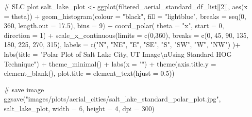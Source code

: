 \documentclass[
  letterpaper,
  DIV=11,
  numbers=noendperiod]{scrreprt}
\newenvironment{Shaded}{\begin{snugshade}}{\end{snugshade}}
\newcommand{\AttributeTok}[1]{\textcolor[rgb]{0.40,0.45,0.13}{#1}}
\newcommand{\CommentTok}[1]{\textcolor[rgb]{0.37,0.37,0.37}{#1}}
\newcommand{\DecValTok}[1]{\textcolor[rgb]{0.68,0.00,0.00}{#1}}
\newcommand{\FloatTok}[1]{\textcolor[rgb]{0.68,0.00,0.00}{#1}}
\newcommand{\FunctionTok}[1]{\textcolor[rgb]{0.28,0.35,0.67}{#1}}
\newcommand{\NormalTok}[1]{\textcolor[rgb]{0.00,0.23,0.31}{#1}}
\newcommand{\OtherTok}[1]{\textcolor[rgb]{0.00,0.23,0.31}{#1}}
\newcommand{\SpecialCharTok}[1]{\textcolor[rgb]{0.37,0.37,0.37}{#1}}
\newcommand{\StringTok}[1]{\textcolor[rgb]{0.13,0.47,0.30}{#1}}
\begin{document}
\begin{Shaded}
\begin{Highlighting}[]
\CommentTok{\# SLC plot}
\NormalTok{salt\_lake\_plot }\OtherTok{\textless{}{-}}
  \FunctionTok{ggplot}\NormalTok{(filtered\_aerial\_standard\_df\_list[[}\DecValTok{2}\NormalTok{]], }
         \FunctionTok{aes}\NormalTok{(}\AttributeTok{x =}\NormalTok{ theta)) }\SpecialCharTok{+}
  \FunctionTok{geom\_histogram}\NormalTok{(}\AttributeTok{colour =} \StringTok{"black"}\NormalTok{, }
                 \AttributeTok{fill =} \StringTok{"lightblue"}\NormalTok{, }
                 \AttributeTok{breaks =} \FunctionTok{seq}\NormalTok{(}\DecValTok{0}\NormalTok{, }\DecValTok{360}\NormalTok{, }\AttributeTok{length.out =} \FloatTok{17.5}\NormalTok{),}
                 \AttributeTok{bins =} \DecValTok{9}\NormalTok{) }\SpecialCharTok{+}
  \FunctionTok{coord\_polar}\NormalTok{(}
    \AttributeTok{theta =} \StringTok{"x"}\NormalTok{, }
    \AttributeTok{start =} \DecValTok{0}\NormalTok{, }
    \AttributeTok{direction =} \DecValTok{1}\NormalTok{) }\SpecialCharTok{+}
  \FunctionTok{scale\_x\_continuous}\NormalTok{(}\AttributeTok{limits =} \FunctionTok{c}\NormalTok{(}\DecValTok{0}\NormalTok{,}\DecValTok{360}\NormalTok{),}
    \AttributeTok{breaks =} \FunctionTok{c}\NormalTok{(}\DecValTok{0}\NormalTok{, }\DecValTok{45}\NormalTok{, }\DecValTok{90}\NormalTok{, }\DecValTok{135}\NormalTok{, }\DecValTok{180}\NormalTok{, }\DecValTok{225}\NormalTok{, }\DecValTok{270}\NormalTok{, }\DecValTok{315}\NormalTok{), }
    \AttributeTok{labels =} \FunctionTok{c}\NormalTok{(}\StringTok{"N"}\NormalTok{, }\StringTok{"NE"}\NormalTok{, }\StringTok{"E"}\NormalTok{, }\StringTok{"SE"}\NormalTok{, }\StringTok{"S"}\NormalTok{, }\StringTok{"SW"}\NormalTok{, }\StringTok{"W"}\NormalTok{, }\StringTok{"NW"}\NormalTok{)}
\NormalTok{  )}\SpecialCharTok{+}
  \FunctionTok{labs}\NormalTok{(}\AttributeTok{title =} \StringTok{"Polar Plot of Salt Lake City, UT Image}\SpecialCharTok{\textbackslash{}n}\StringTok{Using Standard HOG Technique"}\NormalTok{) }\SpecialCharTok{+}
  \FunctionTok{theme\_minimal}\NormalTok{() }\SpecialCharTok{+}
  \FunctionTok{labs}\NormalTok{(}\AttributeTok{x =} \StringTok{""}\NormalTok{) }\SpecialCharTok{+}
  \FunctionTok{theme}\NormalTok{(}\AttributeTok{axis.title.y =} \FunctionTok{element\_blank}\NormalTok{(),}
        \AttributeTok{plot.title =} \FunctionTok{element\_text}\NormalTok{(}\AttributeTok{hjust =} \FloatTok{0.5}\NormalTok{))}

\CommentTok{\# save image}
\FunctionTok{ggsave}\NormalTok{(}\StringTok{"images/plots/aerial\_cities/salt\_lake\_standard\_polar\_plot.jpg"}\NormalTok{, salt\_lake\_plot, }\AttributeTok{width =} \DecValTok{6}\NormalTok{, }\AttributeTok{height =} \DecValTok{4}\NormalTok{, }\AttributeTok{dpi =} \DecValTok{300}\NormalTok{)}
\end{Highlighting}
\end{Shaded}
\end{document}
